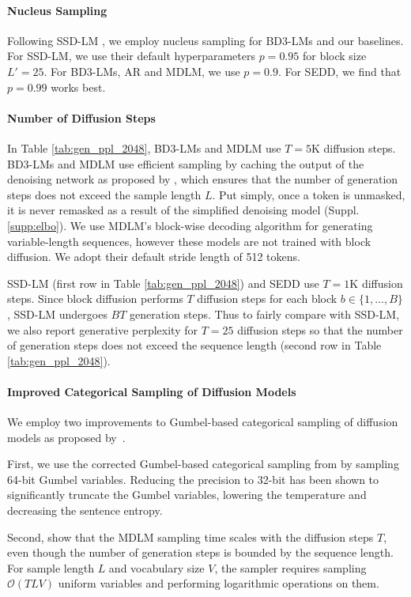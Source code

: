 \documentclass{article} %
\def\algos{BD3-LMs}
\begin{document}
    \paragraph{Nucleus Sampling}
    Following SSD-LM \citep{han2022ssd}, we employ nucleus sampling for \algos{} and our baselines. For SSD-LM, we use their default hyperparameters $p=0.95$ for block size $L'=25$. For \algos{}, AR and MDLM, we use $p=0.9$. For SEDD, we find that $p=0.99$ works best.

     \paragraph{Number of Diffusion Steps} In Table \ref{tab:gen_ppl_2048}, \algos{} and MDLM use $T=5$K diffusion steps. \algos{} and MDLM use efficient sampling by caching the output of the denoising network as proposed by \citet{sahoo2024simple, ou2025your}, which ensures that the number of generation steps does not exceed the sample length $L$. Put simply, once a token is unmasked, it is never remasked as a result of the simplified denoising model (Suppl. \ref{supp:elbo}). We use MDLM's block-wise decoding algorithm for generating variable-length sequences, however these models are not trained with block diffusion. We adopt their default stride length of 512 tokens.
    
   SSD-LM (first row in Table \ref{tab:gen_ppl_2048}) and SEDD use $T=1$K diffusion steps. Since block diffusion performs $T$ diffusion steps for each block $b \in \{ 1, \dots, B \}$, SSD-LM undergoes $BT$ generation steps. Thus to fairly compare with SSD-LM, we also report generative perplexity for $T=25$ diffusion steps so that the number of generation steps does not exceed the sequence length (second row in Table \ref{tab:gen_ppl_2048}).

   \paragraph{Improved Categorical Sampling of Diffusion Models} We employ two improvements to Gumbel-based categorical sampling of diffusion models as proposed by~\citet{zheng2024masked}.
   
   First, we use the corrected Gumbel-based categorical sampling from \citet{zheng2024masked} by sampling 64-bit Gumbel variables. Reducing the precision to 32-bit has been shown to significantly truncate the Gumbel variables, lowering the temperature and decreasing the sentence entropy.
   
   Second, \citet{zheng2024masked} show that the MDLM sampling time scales with the diffusion steps $T$, even though the number of generation steps is bounded by the sequence length. For sample length $L$ and vocabulary size $V$, the sampler requires sampling $\mathcal{O}(T L V)$ uniform variables and performing logarithmic operations on them.
   
\end{document}
